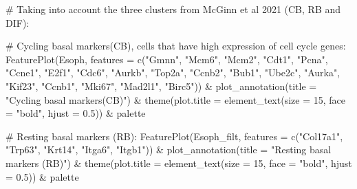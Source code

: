 \documentclass[
  letterpaper,
  DIV=11,
  numbers=noendperiod]{scrreprt}
\newenvironment{Shaded}{\begin{snugshade}}{\end{snugshade}}
\newcommand{\AttributeTok}[1]{\textcolor[rgb]{0.40,0.45,0.13}{#1}}
\newcommand{\CommentTok}[1]{\textcolor[rgb]{0.37,0.37,0.37}{#1}}
\newcommand{\DecValTok}[1]{\textcolor[rgb]{0.68,0.00,0.00}{#1}}
\newcommand{\FloatTok}[1]{\textcolor[rgb]{0.68,0.00,0.00}{#1}}
\newcommand{\FunctionTok}[1]{\textcolor[rgb]{0.28,0.35,0.67}{#1}}
\newcommand{\NormalTok}[1]{\textcolor[rgb]{0.00,0.23,0.31}{#1}}
\newcommand{\SpecialCharTok}[1]{\textcolor[rgb]{0.37,0.37,0.37}{#1}}
\newcommand{\StringTok}[1]{\textcolor[rgb]{0.13,0.47,0.30}{#1}}
\begin{document}
\begin{Shaded}
\begin{Highlighting}[]
\CommentTok{\# Taking into account the three clusters from McGinn et al 2021 (CB, RB and DIF):}

\CommentTok{\# Cycling basal markers(CB), cells that have high expression of cell cycle genes:}
\FunctionTok{FeaturePlot}\NormalTok{(Esoph, }\AttributeTok{features =} \FunctionTok{c}\NormalTok{(}\StringTok{"Gmnn"}\NormalTok{, }\StringTok{"Mcm6"}\NormalTok{, }\StringTok{"Mcm2"}\NormalTok{, }\StringTok{"Cdt1"}\NormalTok{, }\StringTok{"Pcna"}\NormalTok{, }\StringTok{"Ccne1"}\NormalTok{, }\StringTok{"E2f1"}\NormalTok{, }\StringTok{"Cdc6"}\NormalTok{, }\StringTok{"Aurkb"}\NormalTok{, }\StringTok{"Top2a"}\NormalTok{, }\StringTok{"Ccnb2"}\NormalTok{, }\StringTok{"Bub1"}\NormalTok{, }\StringTok{"Ube2c"}\NormalTok{, }\StringTok{"Aurka"}\NormalTok{, }\StringTok{"Kif23"}\NormalTok{, }\StringTok{"Ccnb1"}\NormalTok{, }\StringTok{"Mki67"}\NormalTok{, }\StringTok{"Mad2l1"}\NormalTok{, }\StringTok{"Birc5"}\NormalTok{)) }\SpecialCharTok{\&} \FunctionTok{plot\_annotation}\NormalTok{(}\AttributeTok{title =} \StringTok{"Cycling basal markers(CB)"}\NormalTok{) }\SpecialCharTok{\&} \FunctionTok{theme}\NormalTok{(}\AttributeTok{plot.title =} \FunctionTok{element\_text}\NormalTok{(}\AttributeTok{size =} \DecValTok{15}\NormalTok{, }\AttributeTok{face =} \StringTok{"bold"}\NormalTok{, }\AttributeTok{hjust =} \FloatTok{0.5}\NormalTok{)) }\SpecialCharTok{\&}\NormalTok{ palette}

\CommentTok{\# Resting basal markers (RB):}
\FunctionTok{FeaturePlot}\NormalTok{(Esoph\_filt, }\AttributeTok{features =} \FunctionTok{c}\NormalTok{(}\StringTok{"Col17a1"}\NormalTok{, }\StringTok{"Trp63"}\NormalTok{, }\StringTok{"Krt14"}\NormalTok{, }\StringTok{"Itga6"}\NormalTok{, }\StringTok{"Itgb1"}\NormalTok{)) }\SpecialCharTok{\&} \FunctionTok{plot\_annotation}\NormalTok{(}\AttributeTok{title =} \StringTok{"Resting basal markers (RB)"}\NormalTok{) }\SpecialCharTok{\&} \FunctionTok{theme}\NormalTok{(}\AttributeTok{plot.title =} \FunctionTok{element\_text}\NormalTok{(}\AttributeTok{size =} \DecValTok{15}\NormalTok{, }\AttributeTok{face =} \StringTok{"bold"}\NormalTok{, }\AttributeTok{hjust =} \FloatTok{0.5}\NormalTok{)) }\SpecialCharTok{\&}\NormalTok{ palette}


\end{Highlighting}
\end{Shaded}
\end{document}
